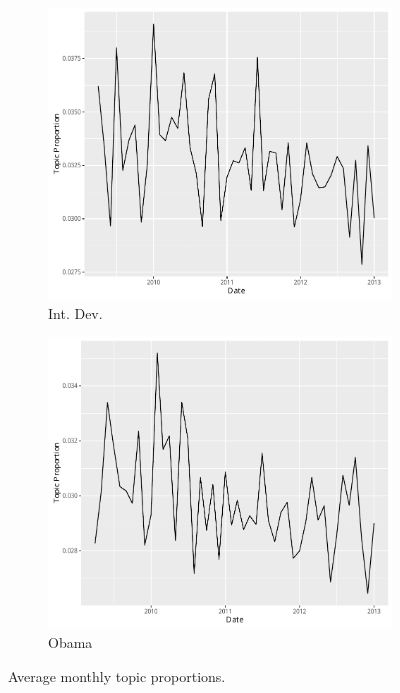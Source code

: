 \documentclass[12pt]{article}
\theoremstyle{definition}
\theoremstyle{algodesc}
\begin{document}
\begin{figure}[htb]
\begin{subfigure}[Afghanistan]{.30\linewidth}
\end{subfigure}
\begin{subfigure}[Int. Dev.]{.30\linewidth}
    \includegraphics[width=\linewidth]{../images/time_plot23.pdf}
    \caption{Int. Dev.} \label{fig:t5}
\end{subfigure}
\begin{subfigure}[Obama]{.30\linewidth}
    \includegraphics[width=\linewidth]{../images/time_plot25.pdf}
    \caption{Obama} \label{fig:t6}
\end{subfigure}
\caption{Average monthly topic proportions.}
\label{fig:topic_time_plots}
\end{figure}
\end{document}
